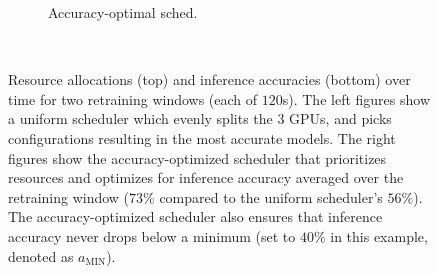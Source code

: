 \begin{figure}[t]
\begin{subfigure}[t]{0.47\columnwidth}
    \caption{\small Accuracy-optimal sched.}
    \label{fig:schedmot-prioritization}
  \end{subfigure}
  ~~
  \caption{Resource allocations (top) and inference accuracies (bottom) over time for two retraining windows (each of $120$s). The left figures show a uniform scheduler which evenly splits the $3$ GPUs, and picks configurations resulting in the most accurate models. The right figures show the accuracy-optimized scheduler that prioritizes resources and optimizes for inference accuracy averaged over the retraining window ($73\%$ compared to the uniform scheduler's $56\%$). The accuracy-optimized scheduler also ensures that inference accuracy never drops below a minimum (set to $40\%$ in this example, denoted as $a_\text{MIN}$). %
  }
  \label{fig:schedmot}
\end{figure}


